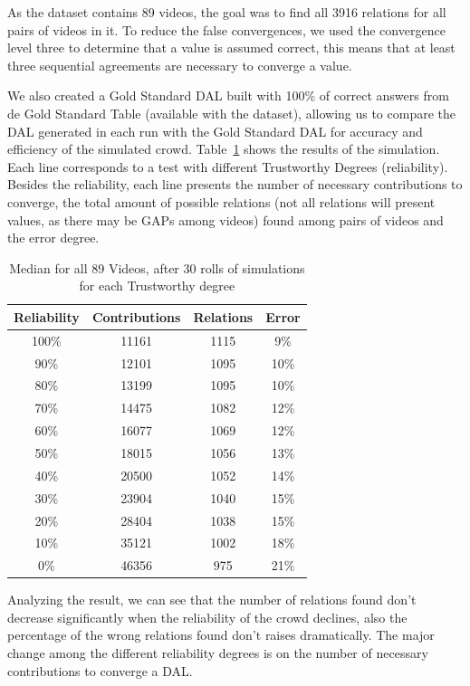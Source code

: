 \documentclass[sigconf]{acmart}
\begin{document}
As the dataset contains 89 videos, the goal was to find all 3916 relations for all pairs of videos in it. To reduce the false convergences, we used the convergence level three to determine that a value is assumed correct, this means that at least three sequential agreements are necessary to converge a value.

We also created a Gold Standard DAL built with 100\% of correct answers from de Gold Standard Table (available with the dataset), allowing us to compare the DAL generated in each run with the Gold Standard DAL for accuracy and efficiency of the simulated crowd.  Table~\ref{xp1} shows the results of the simulation. Each line corresponds to a test with different Trustworthy Degrees (reliability).  Besides the reliability, each line presents the number of necessary contributions to converge, the total amount of possible relations (not all relations will present values, as there may be GAPs among videos) found among pairs of videos and the error degree.


\begin{table}
\begin{center}
\caption{Median for all 89 Videos, after 30 rolls of simulations for each Trustworthy degree} \label{xp1}
\begin{tabular}{|c|c|c|c|}
  \hline
  Reliability & Contributions & Relations & Error
  \\
  \hline
  100\% & 11161 & 1115 & 9\% \\
  90\%  & 12101 & 1095 & 10\% \\
  80\%  & 13199 & 1095 & 10\% \\
  70\%  & 14475 & 1082 & 12\% \\
  60\%  & 16077 & 1069 & 12\% \\
  50\%  & 18015 & 1056 & 13\% \\
  40\%  & 20500 & 1052 & 14\%\\
  30\%  & 23904 & 1040 & 15\% \\
  20\%  & 28404 & 1038 & 15\% \\
  10\%  & 35121 & 1002 & 18\% \\
  0\%   & 46356 & 975  & 21\% \\
  \hline
\end{tabular}
\end{center}
\end{table}

Analyzing the result, we can see that the number of relations found don’t decrease significantly when the reliability of the crowd declines, also the percentage of the wrong relations found don’t raises dramatically. The major change among the different reliability degrees is on the number of necessary contributions to converge a DAL.
\end{document}
